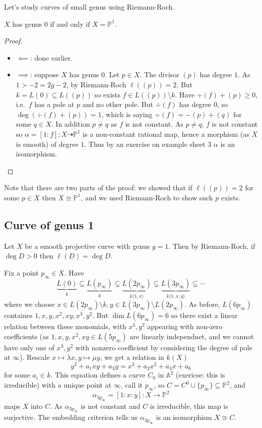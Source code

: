 \documentclass[a4paper]{article}
\renewcommand{\A}{\mathbb{A}}
\renewcommand*{\P}{\mathbb{P}}
\newcommand{\rational}{\dashrightarrow} %
\begin{document}
Let's study curves of small genus using Riemann-Roch.

\begin{proposition}
  \(X\) has genus \(0\) if and only if \(X = \P^1\).
\end{proposition}

\begin{proof}\leavevmode
  \begin{itemize}
  \item \(\impliedby\): done earlier.
  \item \(\implies\): suppose \(X\) has genus \(0\). Let \(p \in X\). The divisor \((p)\) has degree \(1\). As \(1 > -2 = 2g - 2\), by Riemann-Roch \(\ell((p)) = 2\). But \(k = L(0) \subseteq L((p))\) so exists \(f \in L((p)) \setminus k\). Have \(\div(f) + (p) \geq 0\), i.e.\ \(f\) has a pole at \(p\) and no other pole. But \(\div(f)\) has degree \(0\), so \(\deg (\div(f) + (p)) = 1\), which is saying \(\div(f) = -(p) + (q)\) for some \(q \in X\). In addition \(p \neq q\) as \(f\) is not constant. As \(p \neq q\), \(f\) is not constant so \(\alpha = [1:f]: X \rational \P^1\) is a non-constant rational map, hence a morphism (as \(X\) is smooth) of degree \(1\). Thus by an exercise on example sheet 3 \(\alpha\) is an isomorphism.
  \end{itemize}
\end{proof}
Note that there are two parts of the proof: we showed that if \(\ell((p)) = 2\) for some \(p \in X\) then \(X \cong \P^1\), and we used Riemann-Roch to show such \(p\) exists.

\subsection{Curve of genus 1}

Let \(X\) be a smooth projective curve with genus \(g = 1\). Then by Riemann-Roch, if \(\deg D > 0\) then \(\ell(D) = \deg D\).

Fix a point \(p_\infty \in X\). Have
\[
  \underbrace{L(0)}_k \subseteq \underbrace{L(p_\infty)}_k \subsetneq \underbrace{L(2p_\infty)}_{k\langle 1, x \rangle} \subsetneq \underbrace{L(3p_\infty)}_{k \langle 1, x, y\rangle} \subsetneq \cdots
\]
where we choose \(x \in L(2p_\infty) \setminus k, y \in L(3p_\infty) \setminus L(2p_\infty)\). As before, \(L(6p_\infty)\) containes \(1, x, y, x^2, xy, x^3, y^2\). But \(\dim L(6p_\infty) = 6\) so there exist a linear relation between these monomials, with \(x^3, y^2\) appearing with non-zero coefficients (as \(1, x, y, x^2, xy \in L(5 p_\infty)\) are linearly independnet, and we cannot have only one of \(x^3, y^2\) with nonzero coefficient by considering the degree of pole at \(\infty\)). Rescale \(x \mapsto \lambda x, y \mapsto \mu y\), we get a relation in \(k(X)\)
\[
  y^2 + a_1xy + a_3y = x^3 + a_2x^2 + a_4x + a_6
\]
for some \(a_i \in k\). This equation defines a curve \(C_0\) in \(\A^2\) (exericse: this is irreducible) with a unique point at \(\infty\), call it \(p_\infty\), so \(C = C^0 \cup \{p_\infty\} \subseteq \P^2\), and
\[
  \alpha_{3p_\infty} = [1:x:y]: X \to \P^2
\]
maps \(X\) into \(C\). As \(\alpha_{3p_\infty}\) is not constant and \(C\) is irreducible, this map is surjective. The embedding criterion tells us \(\alpha_{3p_\infty}\) is an isomorphism \(X \cong C\).
\end{document}
